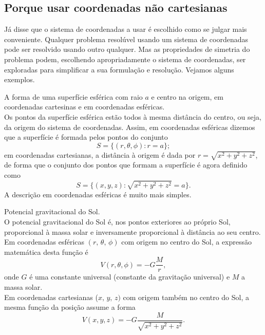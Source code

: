 \subsection*{Porque usar coordenadas não cartesianas}
Já disse que o sistema de coordenadas a usar é escolhido como se julgar mais
conveniente. Qualquer problema resolúvel usando um sistema de coordenadas pode
ser resolvido usando outro qualquer. Mas as propriedades de simetria do problema
podem, escolhendo apropriadamente o sistema de coordenadas, ser exploradas para
simplificar a sua formulação e resolução. Vejamos alguns exemplos.
\begin{examples}
\item A forma de uma superfície esférica com raio $a$ e centro na origem, em
  coordenadas cartesinas e em coordenadas esféricas.\\
  Os pontos da superfície esférica estão todos à mesma distância do centro, ou
  seja, da origem do sistema de coordenadas. Assim, em coordenadas esféricas
  dizemos que a superfície é formada pelos pontos do conjunto
  \begin{equation*}
    S=\{(r,\theta,\phi): r=a\};
  \end{equation*}
  em coordenadas cartesianas, a distância à origem é dada por
  $r=\sqrt{x^2+y^2+z^2}$, de forma que o conjunto dos pontos que formam a
  superfície é agora definido como
  \begin{equation*}
    S=\{(x,y,z): \sqrt{x^2+y^2+z^2}=a\}.
  \end{equation*}
  A descrição em coordenadas esféricas é muito mais simples.
\item
  Potencial gravitacional do Sol.\\
  O potencial gravitacional do Sol é, nos pontos exteriores ao próprio Sol,
  proporcional à massa solar e inversamente proporcional à distância ao seu
  centro. Em coordenadas esféricas $(r,\,\theta,\,\phi)$ com origem no centro do
  Sol, a expressão matemática desta função é
  \begin{equation*}
    V(r,\theta,\phi)=-G\frac{M}{r},
  \end{equation*}
  onde $G$ é uma constante universal (constante da gravitação universal) e $M$ a
  massa solar.\\
  Em coordenadas cartesianas ($x,\,y,\,z)$ com origem também no centro do Sol, a
  mesma função da posição assume a forma
  \begin{equation*}
    V(x,y,z)=-G\frac{M}{\sqrt{x^2+y^2+z^2}}.
  \end{equation*}

\end{examples}
